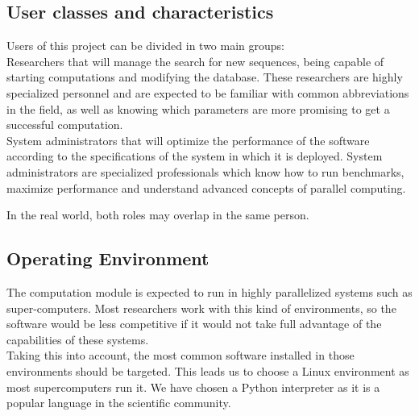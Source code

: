   \subsection{User classes and characteristics}

  Users of this project can be divided in two main groups:\\

  Researchers that will manage the search for new sequences, being capable of
  starting computations and modifying the database. These researchers are highly
  specialized personnel and are expected to be familiar with common abbreviations in
  the field, as well as knowing which parameters are more promising to get a
  successful computation.\\

  System administrators that will optimize the performance of the software according to the
  specifications of the system in which it is deployed. System administrators
  are specialized professionals which know how to run benchmarks, maximize
  performance and understand advanced concepts of parallel computing. 
  

  In the real world, both roles may overlap in the same person.\\

  \subsection{Operating Environment}

  The computation module is expected to run in highly parallelized systems such
  as super-computers. Most researchers work with this kind of environments, so the software
  would be less competitive if it would not take full advantage of
  the capabilities of these systems.\\

  Taking this into account, the most common software installed in those environments should be
  targeted. This leads us to choose a Linux environment as most supercomputers
  run it.   We have chosen a Python interpreter as it is a popular language in the scientific
  community.\\
